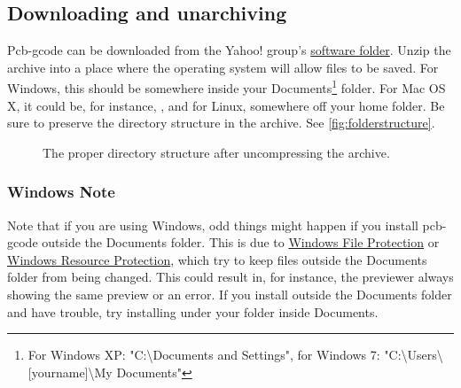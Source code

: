 \documentclass[11pt]{book}
\begin{document}
\subsection{Downloading and unarchiving}
Pcb-gcode can be downloaded from the Yahoo! group's \href{http://groups.yahoo.com/group/pcb-gcode/files/\%21\%20Software}{software folder}.  Unzip the archive into a place where the operating system will allow files to be saved. For Windows, this should be somewhere inside your Documents\footnote{For Windows XP: "C:\textbackslash{}Documents and Settings", for Windows 7: "C:\textbackslash{}Users\textbackslash{}[yourname]\textbackslash{}My Documents" } folder. For Mac OS X, it could be, for instance, , and for Linux, somewhere off your home folder. Be sure to preserve the directory structure in the archive. See \figurename \vref{fig:folderstructure}.

\begin{figure}
	\caption{The proper directory structure after uncompressing the archive.}
	\label{fig:folderstructure}
\end{figure}

\subsubsection{Windows Note}
Note that if you are using Windows, odd things might happen if you install pcb-gcode outside the Documents folder. This is due to \href{http://en.wikipedia.org/wiki/Windows_File_Protection}{Windows File Protection} or \href{http://en.wikipedia.org/wiki/Windows_Resource_Protection}{Windows Resource Protection}, which try to keep files outside the Documents folder from being changed. This could result in, for instance, the previewer always showing the same preview or an  error. If you install outside the Documents folder and have trouble, try installing under your folder inside Documents. 
\end{document}
